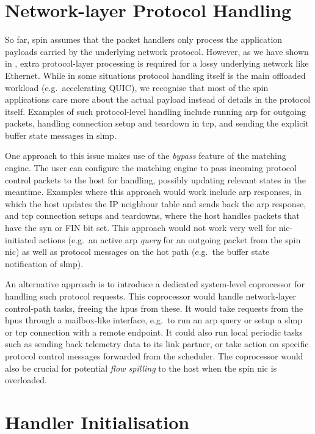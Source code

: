 \section{Network-layer Protocol Handling} \label{sec:l3-protocol-handling}

So far, \ac{spin} assumes that the packet handlers only process the application payloads carried by the underlying network protocol.  However, as we have shown in , extra protocol-layer processing is required for a lossy underlying network like Ethernet.  While in some situations protocol handling itself is the main offloaded workload (e.g.\ accelerating QUIC), we recognise that most of the \ac{spin} applications care more about the actual payload instead of details in the protocol itself.  Examples of such protocol-level handling include running \ac{arp} for outgoing packets, handling connection setup and teardown in \ac{tcp}, and sending the explicit buffer state messages in \ac{slmp}.

One approach to this issue makes use of the \emph{bypass} feature of the matching engine.  The user can configure the matching engine to pass incoming protocol control packets to the host for handling, possibly updating relevant states in the meantime.  Examples where this approach would work include \ac{arp} responses, in which the host updates the IP neighbour table and sends back the \ac{arp} response, and \ac{tcp} connection setups and teardowns, where the host handles packets that have the \ac{syn} or FIN bit set.  This approach would not work very well for \ac{nic}-initiated actions (e.g.\ an active \ac{arp} \emph{query} for an outgoing packet from the \ac{spin} \ac{nic}) as well as protocol messages on the hot path (e.g.\ the buffer state notification of \ac{slmp}).

An alternative approach is to introduce a dedicated system-level coprocessor for handling such protocol requests.  This coprocessor would handle network-layer control-path tasks, freeing the \ac{hpu}s from these.  It would take requests from the \ac{hpu}s through a mailbox-like interface, e.g.\ to run an \ac{arp} query or setup a \ac{slmp} or \ac{tcp} connection with a remote endpoint.  It could also run local periodic tasks such as sending back telemetry data to its link partner, or take action on specific protocol control messages forwarded from the scheduler.  The coprocessor would also be crucial for potential \emph{flow spilling} to the host when the \ac{spin} \ac{nic} is overloaded.

\section{Handler Initialisation} \label{sec:handler-init}

